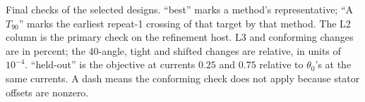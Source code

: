 \begin{table}[tp]\centering\scriptsize
\caption{Final checks of the selected designs. ``best'' marks a method's
representative; ``A $T_{90}$'' marks the earliest repeat-1 crossing of that
target by that method. The L2 column is the primary check on the
refinement host. L3 and conforming changes are in percent; the 40-angle,
tight and shifted changes are relative, in units of $10^{-4}$. ``held-out'' is the objective at currents $0.25$ and
$0.75$ relative to $\theta_0$'s at the same currents. A dash means the
conforming check does not apply because stator offsets are nonzero.}
\label{tab:exp2-refinement}
\end{table}
